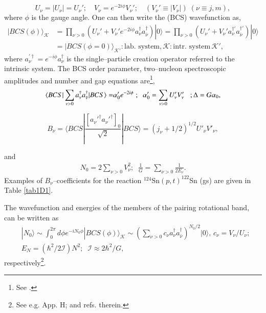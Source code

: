 \begin{equation}
U_\nu=|U_\nu|=U_\nu';\quad V_\nu=e^{-2i\phi}V_\nu';\quad(V_\nu'\equiv|V_\nu|)\;(\nu\equiv j,m),
\end{equation}
where $\phi$ is the gauge angle. One can then write the  (BCS) wavefunction as, 
\begin{equation}
\begin{split}
|BCS(\phi)\rangle_{\mathcal K}&=\prod_{\nu>0} \left(U_\nu'+V_\nu'e^{-2i\phi}a_\nu^\dagger a_{\bar{\nu}}^\dagger\right)|0\rangle=\prod_{\nu>0}\left(U_\nu'+V_\nu'a_\nu^{\dagger'} a_{\bar{\nu}}^{\dagger'}\right)|0\rangle\\
&=|BCS(\phi=0)\rangle_{\mathcal{K'}}:\text{lab. system},\mathcal{K}:\text{intr. system}\,\mathcal{K}',
\end{split}
\end{equation}
where $a_{\nu}^{'\dagger}=e^{-i\phi}a_{\nu}^{\dagger}$ is the single--particle creation operator referred to the intrinsic system.
The BCS  order parameter,  two--nucleon spectroscopic amplitudes and number and gap equations are\footnote{See \cite{Potel:17}.},
\begin{equation}
\begin{split}
\langle {BCS|\sum_{\nu>0}a^\dagger_\nu a^\dagger_{\bar\nu}|BCS} \rangle=&\alpha_0'e^{-2i\phi}\; ; \;\;\alpha_0'=\sum_{\nu>0}U_\nu'V_\nu' \;\;\;;\Delta=G\alpha_0,\\
\end{split}
\end{equation}


\begin{equation}
B_\nu=\langle BCS|\frac{[a_\nu'^\dagger a_\nu'^\dagger]_0}{\sqrt{2}}|BCS\rangle=(j_\nu+1/2)^{1/2}U'_\nu V'_\nu,
\end{equation}

and
\begin{equation}
\begin{split} N_0=2\sum_{\nu>0}V^2_\nu;\;\;\frac{1}{G}=\sum_{\nu>0}\frac{1}{2E_\nu}.
\end{split}
\end{equation}
Examples of $B_\nu$--coefficients for the reaction $^{124}$Sn$(p,t)^{122}$Sn (gs) are given in Table \ref{tab1D1}. 


The wavefunction and energies of the members of the pairing rotational band, can be written as  
\begin{equation*}
\begin{split}
&|N_0\rangle\sim\int_0^{2\pi}d\phi e^{-iN_0\phi}|BCS(\phi)\rangle_{\mathcal K}\sim\left(\sum_{\nu>0}c_\nu a_\nu^\dagger a_{\bar{\nu}}^\dagger\right)^{N_0/2}|0\rangle,\,c_\nu=V_\nu/U_\nu;\\
&E_N=(\hbar^2/2\mathcal{I})N^2 ;\;\;\mathcal{I}\approx 2\hbar^2/G,
\end{split}
\end{equation*}
respectively\footnote{See e.g. \cite{Brink:05} App. H; \cite{Mottelson:02} and refs. therein.}.

